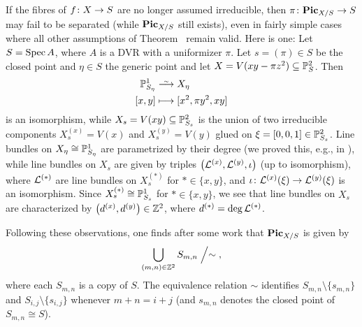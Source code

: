 \documentclass[a4paper,parskip=half,numbers=enddot, DIV=12]{scrreprt}
\begin{document}
\begin{rem}
	If the fibres of $f\colon X\morphism S$ are no longer assumed irreducible, then $\pi\colon \PIC_{X/S}\morphism S$ may fail to be separated (while $\mathbf{Pic}_{X/S}$ still exists), even in fairly simple cases where all other assumptions of Theorem~ remain valid. Here is one: Let $S=\operatorname{Spec} A$, where $A$ is a DVR with a uniformizer $\pi$. Let $s=(\pi)\in S$ be the closed point and $\eta\in S$ the generic point and let $X=V(xy-\pi z^2)\subseteq \mathbb{P}_S^2$. Then
	\begin{align*}
		\IP_{S_\eta}^1&\isomorphism X_\eta\\
		[x,y]&\longmapsto [x^2,\pi y^2,xy]
	\end{align*}
	is an isomorphism, while $X_s=V(xy)\subseteq \mathbb{P}_{S_s}^2$ is the union of two irreducible components $X_s^{(x)}=V(x)$ and $X_s^{(y)}=V(y)$ glued on $\xi=[0,0,1]\in\mathbb{P}_{S_s}^2$. Line bundles on $X_\eta\cong \mathbb{P}_{S_\eta}^1$ are parametrized by their degree (we proved this, e.g., in \cite[Corollary~A.2.1]{alggeo2}), while line bundles on $X_s$ are given by triples $\big(\mathcal{L}^{(x)},\mathcal{L}^{(y)},\iota\big)$ (up to isomorphism), where $\mathcal{L}^{(*)}$ are line bundles on $X_s^{(*)}$ for $*\in\{x,y\}$, and $\iota\colon \Ll^{(x)}(\xi)\morphism\Ll^{(y)}(\xi)$ is an isomorphism. Since $X_s^{(*)}\cong \mathbb{P}_{S_s}^1$ for $*\in\{x,y\}$, we see that line bundles on $X_s$ are characterized by $\big(d^{(x)},d^{(y)}\big)\in\mathbb{Z}^2$, where $d^{(*)}=\deg\mathcal{L}^{(*)}$.
	
	Following these observations, one finds after some work that $\mathbf{Pic}_{X/S}$ is given by 
	\begin{align*}
		\bigcup_{(m,n)\in\mathbb{Z}^2}S_{m,n}\Bigm/\sim\;,
	\end{align*}
	where each $S_{m,n}$ is a copy of $S$. The equivalence relation $\sim$ identifies $S_{m,n}\setminus\{s_{m,n}\}$ and $S_{i,j}\setminus\{s_{i,j}\}$ whenever $m+n=i+j$ (and $s_{m,n}$ denotes the closed point of $S_{m,n}\cong S$).
\end{rem}
\end{document}
